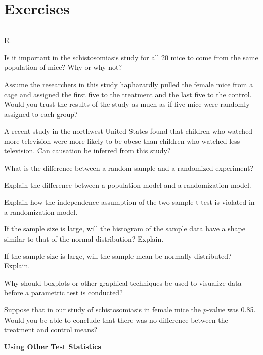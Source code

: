 \documentclass[
]{report}
\newcounter{excount}
\renewcommand{\theexcount}{E\arabic{excount}}
\begin{document}
\hypertarget{exercises}{%
\section*{\texorpdfstring{\textbf{Exercises}}{Exercises}}\label{exercises}}

\vspace{-2em}

\noindent

\rule{\linewidth}{0.4pt}
\setcounter{excount}{0}

\begin{list}{\theexcount.}{ \setlength{\itemsep}{0.5em}}
  \item Is it important in the schistosomiasis study for all 20 mice to come from the same population of mice? Why or why not?
  \item Assume the researchers in this study haphazardly pulled the female mice from a cage and assigned the first five to the treatment and the last five to the control. Would you trust the results of the study as much as if five mice were randomly assigned to each group?
  \item A recent study in the northwest United States found that children who watched more television were
more likely to be obese than children who watched less television. Can causation be inferred from
this study?
  \item What is the difference between a random sample and a randomized experiment?
  \item Explain the difference between a population model and a randomization model.
  \item Explain how the independence assumption of the two-sample t-test is violated in a randomization model.
  \item If the sample size is large, will the histogram of the sample data have a shape similar to that of the normal distribution? Explain.
  \item If the sample size is large, will the sample mean be normally distributed? Explain.
  \item Why should boxplots or other graphical techniques be used to visualize data before a parametric test
is conducted?
  \item Suppose that in our study of schistosomiasis in female mice the $p$-value was 0.85. Would you be able to conclude that there was no difference between the treatment and control means?
  \item \textbf{Using Other Test Statistics} \\

\end{list}
\end{document}

